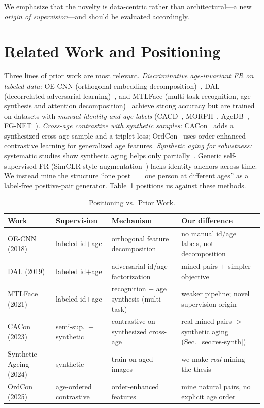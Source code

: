 \documentclass[journal]{IEEEtran}
\begin{document}
We emphasize that the novelty is data-centric rather than architectural---a new \emph{origin of supervision}---and should be evaluated accordingly.

\section{Related Work and Positioning}\label{sec:related}
Three lines of prior work are most relevant. \emph{Discriminative age-invariant FR on labeled data:} OE-CNN (orthogonal embedding decomposition)~\cite{wang2018oecnn}, DAL (decorrelated adversarial learning)~\cite{wang2019dal}, and MTLFace (multi-task recognition, age synthesis and attention decomposition)~\cite{huang2021mtlface} achieve strong accuracy but are trained on datasets with \emph{manual identity and age labels} (CACD~\cite{chen2014cacd}, MORPH~\cite{ricanek2006morph}, AgeDB~\cite{moschoglou2017agedb}, FG-NET~\cite{panis2016fgnet}). \emph{Cross-age contrastive with synthetic samples:} CACon~\cite{wang2024cacon} adds a synthesized cross-age sample and a triplet loss; OrdCon~\cite{wang2025ordcon} uses order-enhanced contrastive learning for generalized age features. \emph{Synthetic aging for robustness:} systematic studies show synthetic aging helps only partially~\cite{yao2024synthageing}. Generic self-supervised FR (SimCLR-style augmentation~\cite{chen2020simclr}) lacks identity anchors across time. We instead mine the structure ``one post $=$ one person at different ages'' as a label-free positive-pair generator. Table~\ref{tab:positioning} positions us against these methods.

\begin{table}[!t]
\renewcommand{\arraystretch}{1.25}
\caption{Positioning vs.\ Prior Work.}
\label{tab:positioning}
\centering
\footnotesize
\begin{tabular}{@{}p{}p{}p{}p{}@{}}
\toprule
Work & Supervision & Mechanism & Our difference \\
\midrule
OE-CNN (2018)~\cite{wang2018oecnn} & labeled id$+$age & orthogonal feature decomposition & no manual id/age labels, not decomposition \\
DAL (2019)~\cite{wang2019dal} & labeled id$+$age & adversarial id/age factorization & mined pairs $+$ simpler objective \\
MTLFace (2021)~\cite{huang2021mtlface} & labeled id$+$age & recognition $+$ age synthesis (multi-task) & weaker pipeline; novel supervision origin \\
CACon (2023)~\cite{wang2024cacon} & semi-sup.\ $+$ synthetic & contrastive on synthesized cross-age & real mined pairs $>$ synthetic aging (Sec.~\ref{sec:res-synth}) \\
Synthetic Ageing (2024)~\cite{yao2024synthageing} & synthetic & train on aged images & we make \emph{real} mining the thesis \\
OrdCon (2025)~\cite{wang2025ordcon} & age-ordered contrastive & order-enhanced features & mine natural pairs, no explicit age order \\
\bottomrule
\end{tabular}
\end{table}
\end{document}
